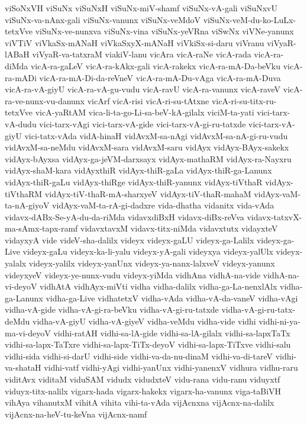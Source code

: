 {viSoNxVH
viSuNx
viSuNxH
viSuNx-miV-shamf
viSuNx-vA-gali
viSuNxvU
viSuNx-va-nAnx-gali
viSuNx-vanunx
viSuNx-veMdoV
viSuNx-veM-du-ko-LuLx-tetxVve
viSuNx-ve-nunxva
viSuNx-vina
viSuNx-yeVRna
viSwNx
viVNe-yanunx
viVTiV
viVkaSx-mANaH
viVkaSxyX-mANaH
viVkiSx-si-daru
viVranu
viVyaR-lABaH
viVyaR-va-tatxraM
viakiV-lanu
vicAra
vicA-raNe
vicA-rada
vicA-ra-diMda
vicA-ra-gaLeV
vicA-ra-kAkx-gali
vicA-rakekx
vicA-ra-mA-Da-beVku
vicA-ra-mADi
vicA-ra-mA-Di-da-reVneV
vicA-ra-mA-Du-vAga
vicA-ra-mA-Duva
vicA-ra-vA-giyU
vicA-ra-vA-gu-vudu
vicA-ravU
vicA-ra-vanunx
vicA-raveV
vicA-ra-ve-nunx-vu-danunx
vicArf
vicA-risi
vicA-ri-su-tAtxne
vicA-ri-su-titx-ru-tetxVve
vicA-yaRtAM
vica-li-ta-go-Li-sa-beV-kA-gilalx
viciM-ta-yati
vici-tarx-vA-dudu
vici-tarx-vAgi
vici-tarx-vA-gide
vici-tarx-vA-gi-ru-tatxde
vici-tarx-vA-giyU
vici-tatx-vAda
vidA-hinaH
vidAvxM-sa-nAgi
vidAvxM-sa-nA-gi-ru-vudu
vidAvxM-sa-neMdu
vidAvxM-sara
vidAvxM-saru
vidAyx
vidAyx-BAyx-sakekx
vidAyx-bAyxsa
vidAyx-ga-jeVM-darxsayx
vidAyx-mathaRM
vidAyx-ra-Nayxru
vidAyx-shaM-kara
vidAyxthiR
vidAyx-thiR-gaLa
vidAyx-thiR-ga-Lanunx
vidAyx-thiR-gaLu
vidAyx-thiRge
vidAyx-thiR-yanunx
vidAyx-tiVthaR
vidAyx-tiVthaRM
vidAyx-tiV-thaR-mA-sharxyeV
vidAyx-tiV-thaR-mahaM
vidAyx-vaM-ta-nA-giyoV
vidAyx-vaM-ta-rA-gi-dadxre
vida-dhatha
vidanitx
vida-vAda
vidavx-dABx-Se-yA-du-da-riMda
vidavxdiBxH
vidavx-diBx-reVva
vidavx-tatxvX-ma-sAmx-tapx-ramf
vidavxtavxM
vidavx-titx-niMda
vidavxtutx
vidayxteV
vidayxyA
vide
videV-sha-dalilx
videyx
videyx-gaLU
videyx-ga-Lalilx
videyx-ga-Live
videyx-gaLu
videyx-ka-li-yalu
videyx-yA-gali
videyxya
videyx-yalUlx
videyx-yalalx
videyx-yalilx
videyx-yanUnx
videyx-ya-nanx-lalxveV
videyx-yanunx
videyxyeV
videyx-ye-nunx-vudu
videyx-yiMda
vidhAna
vidhA-na-vide
vidhA-na-vi-deyoV
vidhAtA
vidhAyx-miVti
vidha
vidha-dalilx
vidha-ga-La-nenxlAlx
vidha-ga-Lanunx
vidha-ga-Live
vidhatetxV
vidha-vAda
vidha-vA-da-vaneV
vidha-vAgi
vidha-vA-gide
vidha-vA-gi-ra-beVku
vidha-vA-gi-ru-tatxde
vidha-vA-gi-ru-tatx-deMdu
vidha-vA-giyU
vidha-vA-giyeV
vidha-veMdu
vidha-vide
vidhi
vidhi-ni-ya-ma-vi-deyoV
vidhi-ratAH
vidhi-sa-lA-gide
vidhi-sa-lA-gilalx
vidhi-sa-lapxTaTx
vidhi-sa-lapx-TaTxre
vidhi-sa-lapx-TiTx-deyoV
vidhi-sa-lapx-TiTxve
vidhi-salu
vidhi-sida
vidhi-si-darU
vidhi-side
vidhi-va-da-nu-dinaM
vidhi-va-di-tareV
vidhi-va-shataH
vidhi-vatf
vidhi-yAgi
vidhi-yanUnx
vidhi-yanenxV
vidhura
vidhu-raru
viditAvx
viditaM
viduSAM
vidudx
vidudxteV
vidu-rana
vidu-ranu
viduyxtf
viduyx-titx-nalilx
vigarx-hada
vigarx-hakekx
vigarx-ha-vanunx
viga-taBiVH
vihAya
vihanutxM
vihitA
vihita
vihi-ta-vAda
vijAcnxna
vijAcnx-na-dalilx
vijAcnx-na-heV-tu-keVna
vijAcnx-namf
}
